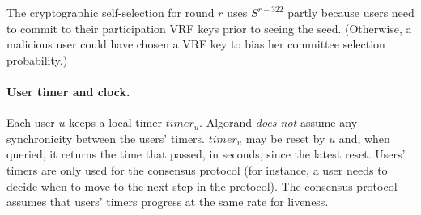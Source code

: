 \documentclass[../main.tex]{subfiles}
\begin{document}
The cryptographic self-selection for round $r$ uses $S^{r-322}$ partly because users need to commit to their 
participation VRF keys prior to seeing the seed. (Otherwise, a malicious user could 
have chosen a VRF key to bias her committee selection probability.)

\paragraph{User timer and clock.}

Each user $u$ keeps a local timer $timer_u$. 
Algorand \emph{does not} assume any synchronicity between the users' timers. 
$timer_u$ may be reset by $u$ and, when queried, it returns the time that passed, in seconds, since the latest reset. 
Users' timers are only used for the consensus protocol (for instance, a user needs to decide when to move to the next step in the protocol). 
The consensus protocol assumes that users' timers progress at the same rate for liveness. 
\end{document}
